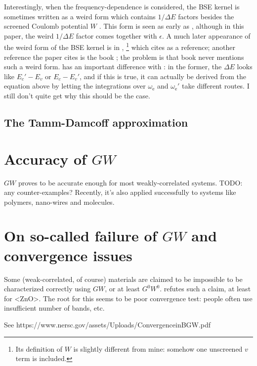 \documentclass[hyperref, a4paper, 12pt]{report}
\def\ce#1{<#1>}%
\begin{document}
Interestingly, when the frequency-dependence is considered, 
the BSE kernel is sometimes written as a weird form
which contains $1/\Delta E$ factors besides the screened Coulomb potential $W$ 
\cite{rohlfing2000electron}.
This form is seen as early as \cite{strinati1984effects},
although in this paper, the weird $1 / \Delta E$ factor comes together with $\epsilon$.
A much later appearance of the weird form of the BSE kernel 
is in \cite{zhang2023effect},%
\footnote{
    Its definition of $W$ is slightly different from mine: 
    somehow one unscreened $v$ term is included.
}
which cites \cite{rohlfing2000electron} as a reference;
another reference the paper cites is the book \cite{bechstedt2016many};
the problem is that book never mentions such a weird form.
\cite{zhang2023effect} has an important difference with \cite{rohlfing2000electron}:
in the former, the $\Delta E$ looks like $E_c' - E_v$ or $E_c - E_v'$,
and if this is true, it can actually be derived from the equation above 
by letting the integrations over $\omega_{\text{e}}$ and $\omega_{\text{e}}'$ 
take different routes.
I still don't quite get why this should be the case. 

\subsection{The Tamm-Damcoff approximation}



\section{Accuracy of $GW$}


$GW$ proves to be accurate enough for most weakly-correlated systems.
TODO: any counter-examples?
Recently, it's also applied successfully to systems like polymers, nano-wires and molecules.

\section{On so-called failure of $GW$ and convergence issues}

Some (weak-correlated, of course) materials are claimed to be impossible 
to be characterized correctly using $GW$,
or at least $G^0 W^0$.
\cite{shih2010quasiparticle} refutes such a claim, 
at least for \ce{ZnO}.
The root for this seems to be poor convergence test:
people often use insufficient number of bands, etc.

See https://www.nersc.gov/assets/Uploads/ConvergenceinBGW.pdf
\end{document}
